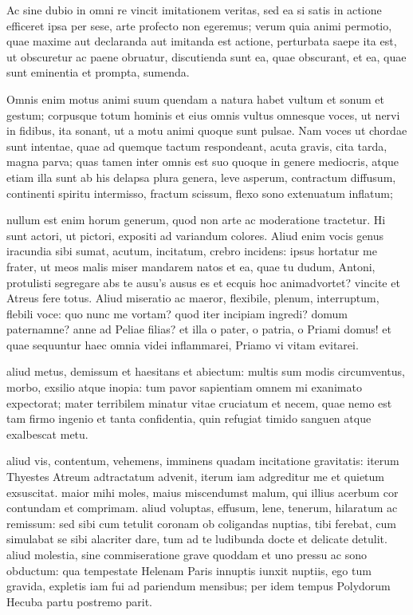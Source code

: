  Ac sine dubio in omni re vincit imitationem veritas, sed ea si satis in actione efficeret ipsa per sese, arte profecto non egeremus; verum quia animi permotio, quae maxime aut declaranda aut imitanda est actione, perturbata saepe ita est, ut obscuretur ac paene obruatur, discutienda sunt ea, quae obscurant, et ea, quae sunt eminentia et prompta, sumenda.

 Omnis enim motus animi suum quendam a natura habet vultum et sonum et gestum; corpusque totum hominis et eius omnis vultus omnesque voces, ut nervi in fidibus, ita sonant, ut a motu animi quoque sunt pulsae. Nam voces ut chordae sunt intentae, quae ad quemque tactum respondeant, acuta gravis, cita tarda, magna parva; quas tamen inter omnis est suo quoque in genere mediocris, atque etiam illa sunt ab his delapsa plura genera, leve asperum, contractum diffusum, continenti spiritu intermisso, fractum scissum, flexo sono extenuatum inflatum;

 nullum est enim horum generum, quod non arte ac moderatione tractetur. Hi sunt actori, ut pictori, expositi ad variandum colores. Aliud enim vocis genus iracundia sibi sumat, acutum, incitatum, crebro incidens: ipsus hortatur me frater, ut meos malis miser mandarem natos et ea, quae tu dudum, Antoni, protulisti segregare abs te ausu's ausus es et ecquis hoc animadvortet? vincite et Atreus fere totus. Aliud miseratio ac maeror, flexibile, plenum, interruptum, flebili voce: quo nunc me vortam? quod iter incipiam ingredi? domum paternamne? anne ad Peliae filias? et illa o pater, o patria, o Priami domus! et quae sequuntur haec omnia videi inflammarei, Priamo vi vitam evitarei.

 aliud metus, demissum et haesitans et abiectum: multis sum modis circumventus, morbo, exsilio atque inopia: tum pavor sapientiam omnem mi exanimato expectorat; mater terribilem minatur vitae cruciatum et necem, quae nemo est tam firmo ingenio et tanta confidentia, quin refugiat timido sanguen atque exalbescat metu.

 aliud vis, contentum, vehemens, imminens quadam incitatione gravitatis: iterum Thyestes Atreum adtractatum advenit, iterum iam adgreditur me et quietum exsuscitat. maior mihi moles, maius miscendumst malum, qui illius acerbum cor contundam et comprimam. aliud voluptas, effusum, lene, tenerum, hilaratum ac remissum: sed sibi cum tetulit coronam ob coligandas nuptias, tibi ferebat, cum simulabat se sibi alacriter dare, tum ad te ludibunda docte et delicate detulit. aliud molestia, sine commiseratione grave quoddam et uno pressu ac sono obductum: qua tempestate Helenam Paris innuptis iunxit nuptiis, ego tum gravida, expletis iam fui ad pariendum mensibus; per idem tempus Polydorum Hecuba partu postremo parit.

